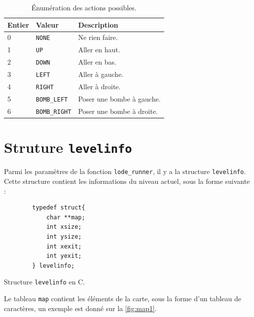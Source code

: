 \begin{table}[!htpb]
    \label{tab:enum-action}
    \begin{tabularx}{\textwidth}{lXX}
        \toprule
        \textbf{Entier} & \textbf{Valeur} & \textbf{Description} \\
        \midrule
        0 & \texttt{NONE} & Ne rien faire. \\
        1 & \texttt{UP} & Aller en haut. \\
        2 & \texttt{DOWN} & Aller en bas. \\
        3 & \texttt{LEFT} & Aller à gauche. \\
        4 & \texttt{RIGHT} & Aller à droite. \\
        5 & \texttt{BOMB\_LEFT} & Poser une bombe à gauche. \\
        6 & \texttt{BOMB\_RIGHT} & Poser une bombe à droite. \\
        \bottomrule
    \end{tabularx}
    \caption{Énumération des actions possibles.}
\end{table}

\newpage

\section{Struture \texttt{levelinfo}}

Parmi les paramètres de la fonction \texttt{lode\_runner}, il y a la structure \texttt{levelinfo}.
Cette structure contient les informations du niveau actuel, sous la forme suivante :

\begin{listing}[!htpb]
    \begin{verbatim}
        typedef struct{
            char **map;
            int xsize;
            int ysize;
            int xexit;
            int yexit;
        } levelinfo;
    \end{verbatim}
    \caption{Structure \texttt{levelinfo} en C.}
    \label{listing:c-levelinfo-struct}
\end{listing}

Le tableau \texttt{map} contient les éléments de la carte, sous la forme d'un tableau de caractères, un exemple est donné sur la \autoref{fig:map1}.

